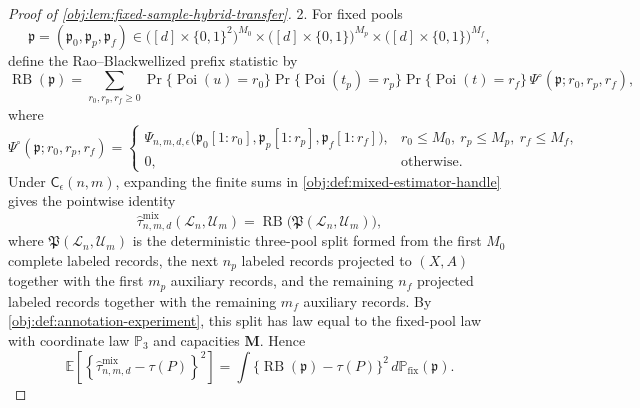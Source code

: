 \documentclass[11pt]{article}
\begin{document}
\begin{proof}[Proof of \cref{obj:lem:fixed-sample-hybrid-transfer}]
2. For fixed pools
\[
\mathfrak p=(\mathfrak p_0,\mathfrak p_p,\mathfrak p_f)
\in
\bigl([d]\times\{0,1\}^2\bigr)^{M_0}
\times
\bigl([d]\times\{0,1\}\bigr)^{M_p}
\times
\bigl([d]\times\{0,1\}\bigr)^{M_f},
\]
define the Rao--Blackwellized prefix statistic by
\[
\operatorname{RB}(\mathfrak p)
=
\sum_{r_0,r_p,r_f\ge0}
\Pr\{\operatorname{Poi}(u)=r_0\}
\Pr\{\operatorname{Poi}(t_p)=r_p\}
\Pr\{\operatorname{Poi}(t)=r_f\}
\,\Psi^\circ(\mathfrak p;r_0,r_p,r_f),
\]
where
\[
\Psi^\circ(\mathfrak p;r_0,r_p,r_f)
=
\begin{cases}
\Psi_{n,m,d,\epsilon}
\bigl(\mathfrak p_0[1{:}r_0],
      \mathfrak p_p[1{:}r_p],
      \mathfrak p_f[1{:}r_f]\bigr),
& r_0\le M_0,\ r_p\le M_p,\ r_f\le M_f,\\
0,&\text{otherwise.}
\end{cases}
\]
Under \(\mathsf C_\epsilon(n,m)\), expanding the finite sums in \cref{obj:def:mixed-estimator-handle} gives the pointwise identity
\[
\widehat\tau^{\mathrm{mix}}_{n,m,d}(\mathcal L_n,\mathcal U_m)
=
\operatorname{RB}\bigl(\mathfrak P(\mathcal L_n,\mathcal U_m)\bigr),
\]
where \(\mathfrak P(\mathcal L_n,\mathcal U_m)\) is the deterministic three-pool split formed from the first \(M_0\) complete labeled records, the next \(n_p\) labeled records projected to \((X,A)\) together with the first \(m_p\) auxiliary records, and the remaining \(n_f\) projected labeled records together with the remaining \(m_f\) auxiliary records.  By \cref{obj:def:annotation-experiment}, this split has law equal to the fixed-pool law with coordinate law \(\mathbb P_3\) and capacities \(\boldsymbol M\).  Hence
\[
\mathbb E\!\left[
\left\{\widehat\tau^{\mathrm{mix}}_{n,m,d}-\tau(P)\right\}^2
\right]
=
\int
\bigl\{\operatorname{RB}(\mathfrak p)-\tau(P)\bigr\}^2
\,d\mathbb P_{\mathrm{fix}}(\mathfrak p).
\]


\end{proof}
\end{document}
